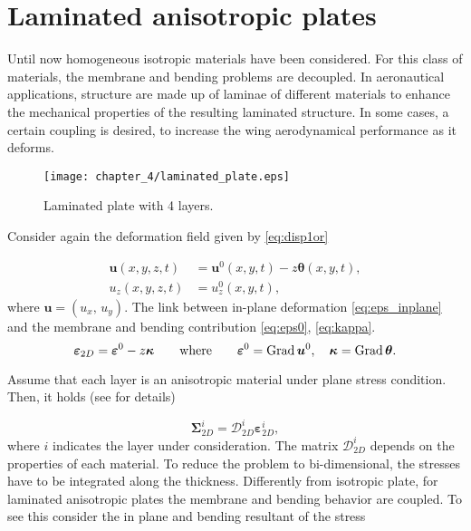 \section{Laminated anisotropic plates}\label{sec:lamAnis}


Until now homogeneous isotropic materials have been considered. For this class of materials, the membrane and bending problems are decoupled. In aeronautical applications, structure are made up of laminae of different materials to enhance the mechanical properties of the resulting laminated structure. In some cases, a certain coupling is desired, to increase the wing aerodynamical performance as it deforms.

\begin{figure}[tb]
	\centering
	\texttt{[image: chapter\_4/laminated\_plate.eps]}
	\caption{Laminated plate with 4 layers.}
	\label{fig:laminated_plate}
\end{figure}

Consider again the deformation field given by \eqref{eq:disp1or}

\begin{equation*}\label{eq:dis1or_2}
\begin{aligned}
\bm{u}(x,y,z,t) &= \bm{u}^0(x,y,t) -z \bm{\theta}(x,y,t), \\
u_z(x,y,z,t) &= u_z^0(x,y,t), 
\end{aligned}
\end{equation*}
where $\bm{u} = (u_x, \, u_y)$. The link between in-plane deformation \eqref{eq:eps_inplane} and the membrane and bending contribution \eqref{eq:eps0}, \eqref{eq:kappa}.
\begin{equation}
\bm{\varepsilon}_{2D} = \bm{\varepsilon}^0 - z \bm{\kappa} \qquad \text{where} \qquad \bm{\varepsilon}^0=\operatorname*{Grad} \bm{u}^0, \quad \bm{\kappa} = \operatorname*{Grad} \bm{\theta}.
\end{equation}

Assume that each layer is an anisotropic material under plane stress condition. Then, it holds (see \cite[Chapter 1]{reddy2003mechanics} for details)

\begin{equation*}
\bm{\Sigma}_{2D}^i = \bm{\mathcal{D}}_{2D}^i \bm{\varepsilon}_{2D}^i,
\end{equation*}  
where $i$ indicates the layer under consideration. The matrix $ \bm{\mathcal{D}}_{2D}^i$ depends on the properties of each material. To reduce the problem to bi-dimensional,  the stresses have to be integrated along the thickness. Differently from isotropic plate, for laminated anisotropic plates the membrane and bending behavior are coupled. To see this consider the in plane and bending resultant of the stress 

